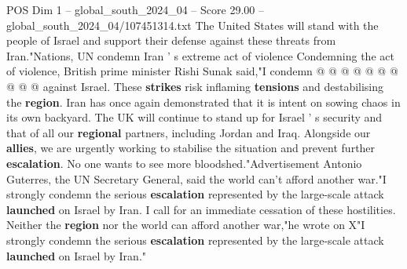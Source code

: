 \begin{textsample}{POS Dim 1 – global\_south\_2024\_04 – Score 29.00 – global\_south\_2024\_04/107451314.txt}
The United States will stand with the people of Israel and support their defense against these threats from Iran."Nations, UN condemn Iran ' s extreme act of violence Condemning the act of violence, British prime minister Rishi Sunak said,"I condemn @ @ @ @ @ @ @ @ @ @ against Israel.
These \textbf{strikes} risk inflaming \textbf{tensions} and destabilising the \textbf{region}.
Iran has once again demonstrated that it is intent on sowing chaos in its own backyard.
The UK will continue to stand up for Israel ' s security and that of all our \textbf{regional} partners, including Jordan and Iraq.
Alongside our \textbf{allies}, we are urgently working to stabilise the situation and prevent further \textbf{escalation}.
No one wants to see more bloodshed."Advertisement Antonio Guterres, the UN Secretary General, said the world can't afford another war."I strongly condemn the serious \textbf{escalation} represented by the large-scale attack \textbf{launched} on Israel by Iran.
I call for an immediate cessation of these hostilities.
Neither the \textbf{region} nor the world can afford another war,"he wrote on X"I strongly condemn the serious \textbf{escalation} represented by the large-scale attack \textbf{launched} on Israel by Iran."

\end{textsample}
